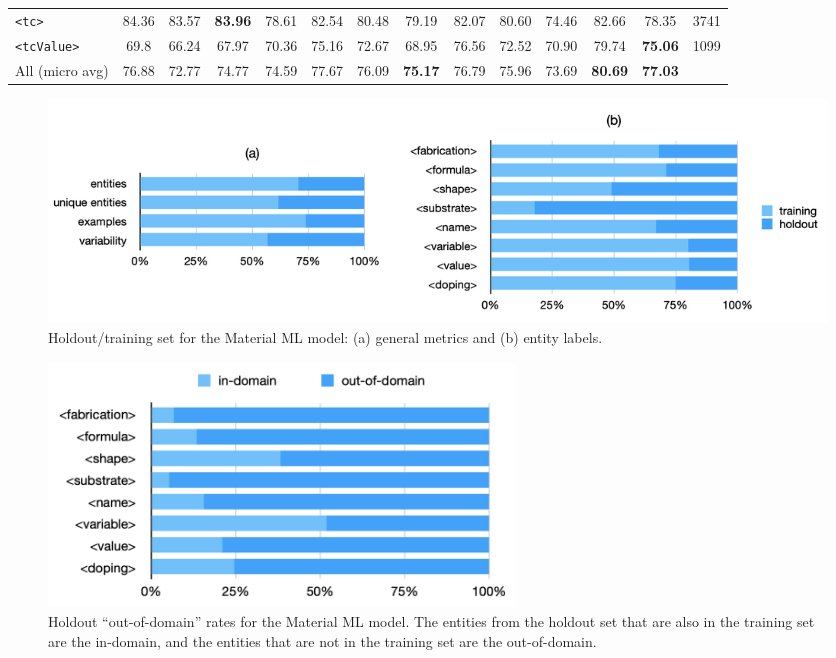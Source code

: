 \documentclass[]{interact}
\theoremstyle{plain}%
\theoremstyle{definition}
\theoremstyle{remark}
\begin{document}
\begin{table}[ht]
{{\begin{tabular}{l ccc ccc ccc ccc r}
            \texttt{<tc>}         & 84.36                            & 83.57                                     & \textbf{83.96}                                     & 78.61      & 82.54      & 80.48          & 79.19          & 82.07      & 80.60          & 74.46      & 82.66          & 78.35          & 3741 \\
            \texttt{<tcValue>}    & 69.8                             & 66.24                                     & 67.97                                              & 70.36      & 75.16      & 72.67          & 68.95          & 76.56      & 72.52          & 70.90      & 79.74          & \textbf{75.06} & 1099 \\
            \midrule
            All (micro avg)       & 76.88                            & 72.77                                     & 74.77                                              & 74.59      & 77.67      & 76.09          & \textbf{75.17} & 76.79      & 75.96          & 73.69      & \textbf{80.69} & \textbf{77.03}        \\
            \bottomrule
        \end{tabular}
    }
    }
    \label{tab:evaluation-superconductors-ML-model} 
\end{table}

\begin{figure}[ht]
    \centering
    \includegraphics[width=\textwidth]{material-holdout-training-set}
    \caption{Holdout/training set for the Material ML model: (a) general metrics and (b) entity labels.}
    \label{fig:material-training-holdout-set-distribution}
\end{figure}

\begin{figure}[ht]
    \centering
    \includegraphics[width=0.6\textwidth]{material-out-domain-holdout-unique}
    \caption{Holdout ``out-of-domain'' rates for the Material ML model. The entities from the holdout set that are also in the training set are the in-domain, and the entities that are not in the training set are the out-of-domain.}
    \label{fig:material-out-domain-holdout}
\end{figure}
\end{document}
